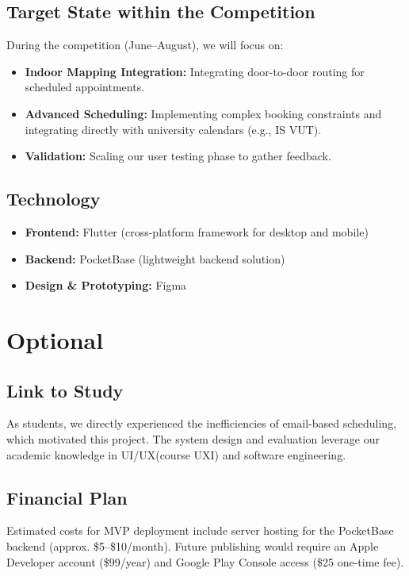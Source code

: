 \documentclass[12pt,a4paper]{article}
\begin{document}
\subsection{Target State within the Competition}
During the competition (June--August), we will focus on:
\begin{itemize}
    \item \textbf{Indoor Mapping Integration:} Integrating door-to-door routing for scheduled appointments.
    \item \textbf{Advanced Scheduling:} Implementing complex booking constraints and integrating directly with university calendars (e.g., IS VUT).
    \item \textbf{Validation:} Scaling our user testing phase to gather feedback.
\end{itemize}

\subsection{Technology}
\begin{itemize}
    \item \textbf{Frontend:} Flutter (cross-platform framework for desktop and mobile)
    \item \textbf{Backend:} PocketBase (lightweight backend solution)
    \item \textbf{Design \& Prototyping:} Figma
\end{itemize}

\section{Optional}

\subsection{Link to Study}
As students, we directly experienced the inefficiencies of email-based scheduling, which motivated this project. The system design and evaluation leverage our academic knowledge in UI/UX(course UXI) and software engineering.
\subsection{Financial Plan}
Estimated costs for MVP deployment include server hosting for the PocketBase backend (approx. \$5--\$10/month). Future publishing would require an Apple Developer account (\$99/year) and Google Play Console access (\$25 one-time fee).
\end{document}
